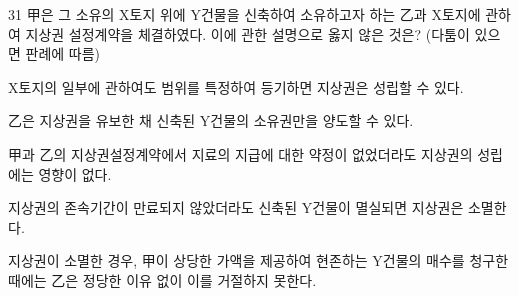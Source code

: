 \begin{question}{31}
甲은 그 소유의 X토지 위에 Y건물을 신축하여 소유하고자 하는 乙과 X토지에 관하여 지상권 설정계약을 체결하였다. 이에 관한 설명으로 옳지 않은 것은? (다툼이 있으면 판례에 따름)
\begin{choices}
  \item X토지의 일부에 관하여도 범위를 특정하여 등기하면 지상권은 성립할 수 있다.
  \item 乙은 지상권을 유보한 채 신축된 Y건물의 소유권만을 양도할 수 있다.
  \item 甲과 乙의 지상권설정계약에서 지료의 지급에 대한 약정이 없었더라도 지상권의 성립에는 영향이 없다.
  \item 지상권의 존속기간이 만료되지 않았더라도 신축된 Y건물이 멸실되면 지상권은 소멸한다.
  \item 지상권이 소멸한 경우, 甲이 상당한 가액을 제공하여 현존하는 Y건물의 매수를 청구한 때에는 乙은 정당한 이유 없이 이를 거절하지 못한다.
\end{choices}
\end{question}
